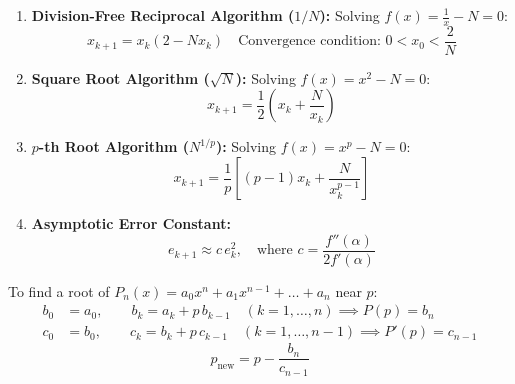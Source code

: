 \begin{theorembox}
\begin{enumerate}[label=\textbf{\arabic*.},noitemsep]
    \item \textbf{Division-Free Reciprocal Algorithm ($1/N$):} Solving $f(x) = \frac{1}{x} - N = 0$:
    \begin{equation}
        \boxed{x_{k+1} = x_k (2 - N x_k)} \quad \text{Convergence condition: } 0 < x_0 < \frac{2}{N}
    \end{equation}
    \item \textbf{Square Root Algorithm ($\sqrt{N}$):} Solving $f(x) = x^2 - N = 0$:
    \begin{equation}
        \boxed{x_{k+1} = \frac{1}{2}\left( x_k + \frac{N}{x_k} \right)}
    \end{equation}
    \item \textbf{$p$-th Root Algorithm ($N^{1/p}$):} Solving $f(x) = x^p - N = 0$:
    \begin{equation}
        \boxed{x_{k+1} = \frac{1}{p}\left[ (p - 1)x_k + \frac{N}{x_k^{p-1}} \right]}
    \end{equation}
    \item \textbf{Asymptotic Error Constant:}
    \begin{equation}
        e_{k+1} \approx c \, e_k^2, \quad \text{where } \boxed{c = \frac{f''(\alpha)}{2 f'(\alpha)}}
    \end{equation}
\end{enumerate}
\end{theorembox}

\begin{notebox}
To find a root of $P_n(x) = a_0 x^n + a_1 x^{n-1} + \dots + a_n$ near $p$:
\begin{align}
    b_0 &= a_0, \qquad b_k = a_k + p\,b_{k-1} \quad (k = 1, \dots, n) \implies P(p) = b_n \\
    c_0 &= b_0, \qquad c_k = b_k + p\,c_{k-1} \quad (k = 1, \dots, n-1) \implies P'(p) = c_{n-1}
\end{align}
\begin{equation}
    \boxed{p_{\text{new}} = p - \frac{b_n}{c_{n-1}}}
\end{equation}
\end{notebox}

